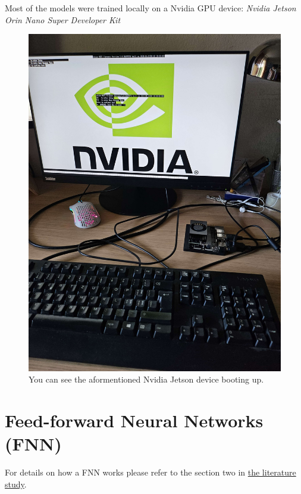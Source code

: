 \documentclass{article}
\begin{document}
Most of the models were trained locally on a Nvidia GPU device: \textit{Nvidia 
Jetson Orin Nano Super Developer Kit}

\begin{figure}[htbp]
    \centering
    \includegraphics[width=0.5\paperwidth]{images/JetsonBoot.jpg}
    \caption{You can see the aformentioned Nvidia Jetson device booting up.}
    \label{fig:JetsonBoot}
\end{figure}

\newpage
\tableofcontents
\newpage

\section{Feed-forward Neural Networks (FNN)}
For details on how a FNN works please refer to the section two in \href{https://github.com/AntonStantan/matura/blob/main/zwischenProdukt/LiteraturstudieAnton.pdf}
{the literature study}.
\end{document}
